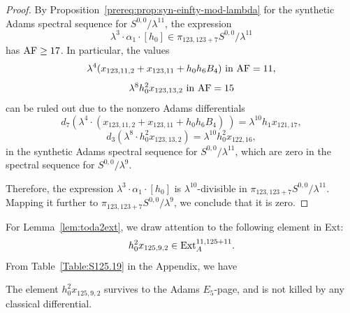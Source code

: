 \begin{proof}
By Proposition~\ref{prereq:prop:syn-einfty-mod-lambda} for the synthetic Adams spectral sequence for $S^{0,0}/\lambda^{11}$, the expression 
$$\lambda^3 \cdot \alpha_1 \cdot [h_0] \in  \pi_{123,123+7} S^{0,0}/\lambda^{11}$$
has $\mathrm{AF} \ge 17$. %
In particular, the values $$\lambda^4(x_{123,11,2}+x_{123,11}+h_0h_6B_4) \ \text{in} \ \AF=11,$$ 
$$\lambda^8 h_0^2x_{123,13,2} \ \text{in} \ \mathrm{AF}=15$$
can be ruled out due to the nonzero Adams differentials
$$d_7( \lambda^4 \cdot (x_{123,11,2}+x_{123,11}+h_0h_6B_4) \ ) = \lambda^{10} h_1x_{121,17},$$
$$d_3 (\lambda^8 \cdot h_0^2x_{123,13,2}) = \lambda^{10} h_0^2 x_{122,16},$$
in the synthetic Adams spectral sequence for $S^{0,0}/\lambda^{11}$, which are zero in the spectral sequence for $S^{0,0}/\lambda^{9}$.

Therefore, the expression $\lambda^3 \cdot \alpha_1 \cdot [h_0]$ is $\lambda^{10}$-divisible in $\pi_{123,123+7} S^{0,0}/\lambda^{11}$. Mapping it further to $\pi_{123,123+7} S^{0,0}/\lambda^9$, we conclude that it is zero. 
\end{proof}







For Lemma~\ref{lem:toda2ext}, we draw attention to the following element in Ext:
$$h_0^2x_{125,9,2} \in \mathrm{Ext}_A^{11, 125+11}.$$
From Table~\ref{Table:S125.19} in the Appendix, we have
\begin{axiom} \label{fact:h02x1259}
    The element $h_0^2x_{125,9,2}$ survives to the Adams $E_5$-page, and is not killed by any classical differential.
\end{axiom}

